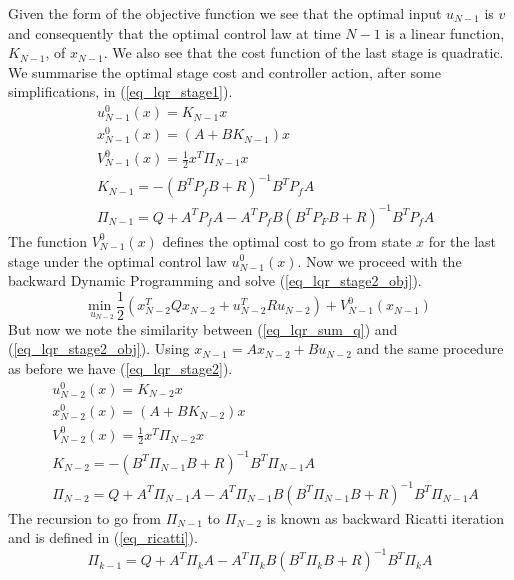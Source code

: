 Given the form of the objective function we see that the optimal input $u_{N-1}$ is $v$ and consequently that the optimal control law at time $N-1$ is a linear function, $K_{N-1}$, of $x_{N-1}$. We also see that the cost function of the last stage is quadratic. We summarise the optimal stage cost and controller action, after some simplifications, in (\ref{eq_lqr_stage1}).
\begin{equation}
\begin{aligned}
&u^0_{N-1}(x) = K_{N-1}x \\
&x^0_{N-1}(x) = (A+BK_{N-1})x \\
&V^0_{N-1}(x) = \frac{1}{2}x^T\Pi_{N-1}x \\
&K_{N-1} = -(B^TP_fB+R)^{-1}B^TP_fA \\
&\Pi_{N-1} = Q + A^TP_fA-A^TP_fB(B^TP_FB+R)^{-1}B^TP_fA 
\end{aligned}
\label{eq_lqr_stage1}
\end{equation} 
The function $V^0_{N-1}(x)$ defines the optimal cost to go from state $x$ for the last stage under the optimal control law $u^0_{N-1}(x)$. Now we proceed with the backward Dynamic Programming and solve (\ref{eq_lqr_stage2_obj}).
\begin{equation}
\underset{u_{N-2}}{\text{min }}  \frac{1}{2}\left(x_{N-2}^TQx_{N-2} + u_{N-2}^TRu_{N-2} \right) + V^0_{N-1}(x_{N-1})
\label{eq_lqr_stage2_obj}
\end{equation}
But now we note the similarity between (\ref{eq_lqr_sum_q}) and (\ref{eq_lqr_stage2_obj}). Using $x_{N-1}=Ax_{N-2}+Bu_{N-2}$ and the same procedure as before we have (\ref{eq_lqr_stage2}). 
\begin{equation}
\begin{aligned}
&u^0_{N-2}(x) = K_{N-2}x \\
&x^0_{N-2}(x) = (A+BK_{N-2})x \\
&V^0_{N-2}(x) = \frac{1}{2}x^T\Pi_{N-2}x \\
&K_{N-2} = -(B^T\Pi_{N-1}B+R)^{-1}B^T\Pi_{N-1}A \\
&\Pi_{N-2} = Q + A^T\Pi_{N-1}A-A^T\Pi_{N-1}B(B^T\Pi_{N-1}B+R)^{-1}B^T\Pi_{N-1}A 
\end{aligned}
\label{eq_lqr_stage2}
\end{equation} 
The recursion to go from $\Pi_{N-1}$ to $\Pi_{N-2}$ is known as backward Ricatti iteration and is defined in (\ref{eq_ricatti}).
\begin{equation}
\Pi_{k-1} = Q + A^T\Pi_{k}A-A^T\Pi_{k}B(B^T\Pi_{k}B+R)^{-1}B^T\Pi_{k}A  
\label{eq_ricatti}
\end{equation}
